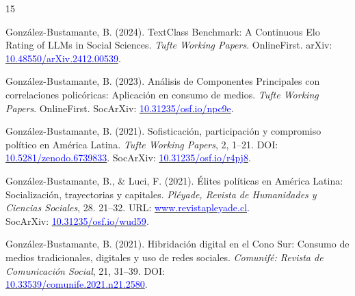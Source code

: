 \begin{publications}

\begin{benumerate}{15}

\item{González-Bustamante, B. (2024). TextClass Benchmark: A Continuous Elo Rating of LLMs in Social Sciences. {\itshape Tufte Working Papers}. OnlineFirst. arXiv: \href{https://doi.org/10.48550/arXiv.2412.00539}{\textcolor{blue}{10.48550/arXiv.2412.00539}}.}\vspace{1mm}
 
\item{González-Bustamante, B. (2023). Análisis de Componentes Principales con correlaciones policóricas: Aplicación en consumo de medios. {\itshape Tufte Working Papers}. OnlineFirst. SocArXiv: \href{https://doi.org/10.31235/osf.io/npc9e}{\textcolor{blue}{10.31235/osf.io/npc9e}}.}\vspace{1mm}

\item{González-Bustamante, B. (2021). Sofisticación, participación y compromiso político en América Latina. {\itshape Tufte Working Papers}, 2, 1--21. DOI: \href{https://doi.org/10.5281/zenodo.6739833}{\textcolor{blue}{10.5281/zenodo.6739833}}. SocArXiv: \href{https://doi.org/10.31235/osf.io/r4pj8}{\textcolor{blue}{10.31235/osf.io/r4pj8}}.}\vspace{1mm}

\item{González-Bustamante, B., \& Luci, F. (2021). Élites políticas en América Latina: Socialización, trayectorias y capitales. {\itshape Pléyade, Revista de Humanidades y Ciencias Sociales}, 28. 21--32. URL: \href{http://www.revistapleyade.cl/index.php/OJS/article/view/359}{\textcolor{blue}{www.revistapleyade.cl}}. \\ SocArXiv: \href{https://doi.org/10.31235/osf.io/wud59}{\textcolor{blue}{10.31235/osf.io/wud59}}.}\vspace{1mm}

\item{González-Bustamante, B. (2021).  Hibridación digital en el Cono Sur: Consumo de medios tradicionales, digitales y uso de redes sociales. {\itshape Comunifé: Revista de Comunicación Social}, 21, 31--39. DOI: \\ \href{https://doi.org/10.33539/comunife.2021.n21.2580}{\textcolor{blue}{10.33539/comunife.2021.n21.2580}}.}\vspace{1mm} %


\end{benumerate}
\end{publications}
